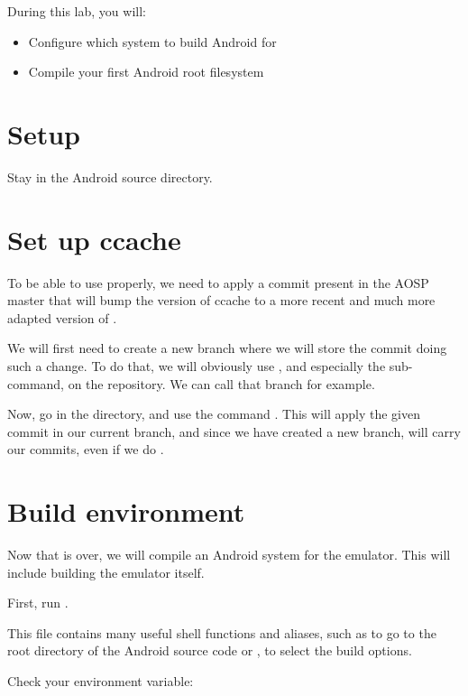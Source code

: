 
During this lab, you will:
\begin{itemize}
  \item Configure which system to build Android for
  \item Compile your first Android root filesystem
\end{itemize}

\section{Setup}

Stay in the Android source directory.

\section{Set up ccache}

To be able to use  properly, we need to apply a commit
present in the AOSP master that will bump the version of ccache to a
more recent and much more adapted version of .

We will first need to create a new branch where we will store the
commit doing such a change. To do that, we will obviously use
, and especially the  sub-command, on the
 repository. We can call that branch
 for example.

Now, go in the  directory, and use the command
. This will apply the given commit in
our current branch, and since we have created a new branch,
 will carry our commits, even if we do .

\section{Build environment}

Now that  is over, we will compile an Android system
for the emulator. This will include building the emulator itself.

First, run .

This file contains many useful shell functions and aliases, such as
 to go to the root directory of the Android source code or
, to select the build options.

Check your  environment variable:

